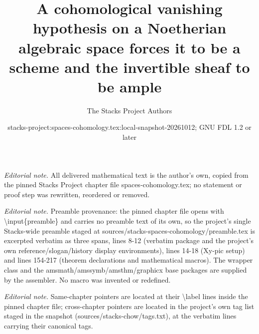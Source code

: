 \documentclass[10pt,a4paper]{amsart}
\title{A cohomological vanishing hypothesis on a Noetherian algebraic space forces it to be a scheme and the invertible sheaf to be ample}
\author{The Stacks Project Authors}
\date{stacks-project:spaces-cohomology.tex:local-snapshot-20261012; GNU FDL 1.2 or later}
\theoremstyle{plain}
\theoremstyle{definition}
\theoremstyle{remark}
\numberwithin{equation}{subsection}
\begin{document}
\maketitle
\noindent\textit{Editorial note.} All delivered mathematical text is the author's own, copied from the pinned Stacks Project chapter file spaces-cohomology.tex; no statement or proof step was rewritten, reordered or removed.\par\medskip
\noindent\textit{Editorial note.} Preamble provenance: the pinned chapter file opens with \textbackslash{}input\{preamble\} and carries no preamble text of its own, so the project's single Stacks-wide preamble staged at sources/stacks-spaces-cohomology/preamble.tex is excerpted verbatim as three spans, lines 8-12 (verbatim package and the project's own reference/slogan/history display environments), lines 14-18 (Xy-pic setup) and lines 154-217 (theorem declarations and mathematical macros). The wrapper class and the amsmath/amssymb/amsthm/graphicx base packages are supplied by the assembler. No macro was invented or redefined.\par\medskip
\noindent\textit{Editorial note.} Same-chapter pointers are located at their \textbackslash{}label lines inside the pinned chapter file; cross-chapter pointers are located in the project's own tag list staged in the snapshot (sources/stacks-chow/tags.txt), at the verbatim lines carrying their canonical tags.\par\medskip
\end{document}
